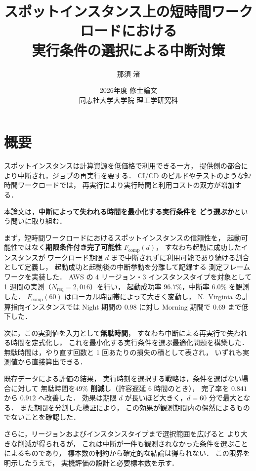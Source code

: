 \documentclass[11pt,a4paper]{ltjsreport}
\title{\vspace{-10mm}
スポットインスタンス上の短時間ワークロードにおける\\
実行条件の選択による中断対策}
\author{那須 渚}
\date{2026年度 修士論文\\[2mm] 同志社大学大学院 理工学研究科}
\newcommand{\Fcomp}{F_{\mathrm{comp}}}
\newcommand{\Nreq}{N_{\mathrm{req}}}
\begin{document}
\maketitle

\chapter*{概要}

スポットインスタンスは計算資源を低価格で利用できる一方，
提供側の都合により中断され，ジョブの再実行を要する．
CI/CD のビルドやテストのような短時間ワークロードでは，
再実行により実行時間と利用コストの双方が増加する．

本論文は，\textbf{中断によって失われる時間を最小化する実行条件を
どう選ぶか}という問いに取り組む．

まず，短時間ワークロードにおけるスポットインスタンスの信頼性を，
起動可能性ではなく\textbf{期限条件付き完了可能性} $\Fcomp(d)$，
すなわち起動に成功したインスタンスが
ワークロード期限 $d$ まで中断されずに利用可能であり続ける割合として定義し，
起動成功と起動後の中断挙動を分離して記録する
測定フレームワークを実装した．
AWS の 4 リージョン・3 インスタンスタイプを対象として
1 週間の実測（$\Nreq = 2{,}016$）を行い，
起動成功率 $96.7\%$，中断率 $6.0\%$ を観測した．
$\Fcomp(60)$ はローカル時間帯によって大きく変動し，
N.~Virginia の計算指向インスタンスでは
Night 期間の $0.98$ に対し Morning 期間で $0.69$ まで低下した．

次に，この実測値を入力として\textbf{無駄時間}，
すなわち中断による再実行で失われる時間を定式化し，
これを最小化する実行条件を選ぶ最適化問題を構築した．
無駄時間は，やり直す回数と 1 回あたりの損失の積として表され，
いずれも実測値から直接算出できる．

既存データによる評価の結果，
実行時刻を選択する戦略は，条件を選ばない場合に対して
無駄時間を\textbf{$49\%$ 削減}し（許容遅延 6 時間のとき），
完了率を $0.841$ から $0.912$ へ改善した．
効果は期限 $d$ が長いほど大きく，$d = 60$ 分で最大となる．
また期間を分割した検証により，
この効果が観測期間内の偶然によるものでないことを確認した．

さらに，リージョンおよびインスタンスタイプまで選択範囲を広げると
より大きな削減が得られるが，
これは中断が一件も観測されなかった条件を選ぶことによるものであり，
標本数の制約から確定的な結論は得られない．
この限界を明示したうえで，
実機評価の設計と必要標本数を示す．

\tableofcontents
\listoffigures
\listoftables
\end{document}
